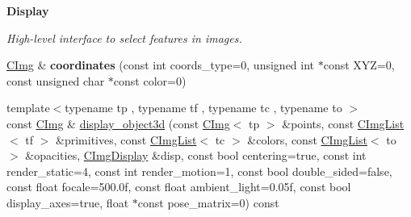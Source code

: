 \begin{Indent}{\bf Display}
\begin{DoxyCompactItemize}
\begin{DoxyCompactList}\small\item\em High-\/level interface to select features in images. \end{DoxyCompactList}\item 
\hypertarget{structcimg__library_1_1_c_img_ac6f2292cfa5c9a9add2b8c4631cf6430}{\hyperlink{structcimg__library_1_1_c_img}{C\-Img} \& {\bfseries coordinates} (const int coords\-\_\-type=0, unsigned int $\ast$const X\-Y\-Z=0, const unsigned char $\ast$const color=0)}\label{structcimg__library_1_1_c_img_ac6f2292cfa5c9a9add2b8c4631cf6430}

\item 
\hypertarget{structcimg__library_1_1_c_img_a44be2b8159a1706c1d7625b4d7a34d3d}{{\footnotesize template$<$typename tp , typename tf , typename tc , typename to $>$ }\\const \hyperlink{structcimg__library_1_1_c_img}{C\-Img} \& \hyperlink{structcimg__library_1_1_c_img_a44be2b8159a1706c1d7625b4d7a34d3d}{display\-\_\-object3d} (const \hyperlink{structcimg__library_1_1_c_img}{C\-Img}$<$ tp $>$ \&points, const \hyperlink{structcimg__library_1_1_c_img_list}{C\-Img\-List}$<$ tf $>$ \&primitives, const \hyperlink{structcimg__library_1_1_c_img_list}{C\-Img\-List}$<$ tc $>$ \&colors, const \hyperlink{structcimg__library_1_1_c_img_list}{C\-Img\-List}$<$ to $>$ \&opacities, \hyperlink{structcimg__library_1_1_c_img_display}{C\-Img\-Display} \&disp, const bool centering=true, const int render\-\_\-static=4, const int render\-\_\-motion=1, const bool double\-\_\-sided=false, const float focale=500.\-0f, const float ambient\-\_\-light=0.\-05f, const bool display\-\_\-axes=true, float $\ast$const pose\-\_\-matrix=0) const }\label{structcimg__library_1_1_c_img_a44be2b8159a1706c1d7625b4d7a34d3d}


\end{DoxyCompactItemize}
\end{Indent}

